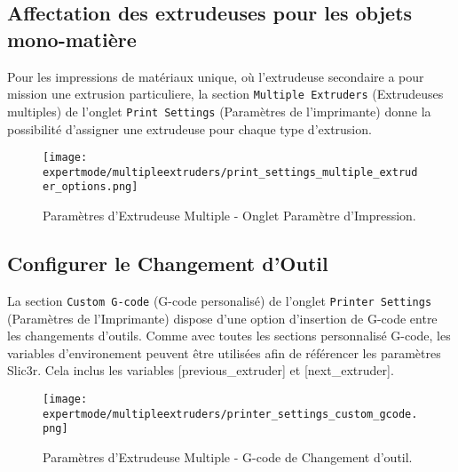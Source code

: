
\subsection{Affectation des extrudeuses pour les objets mono-mati\`ere} %
\label{sub:assigning_extruders}

Pour les impressions de mat\'eriaux unique, o\`u l'extrudeuse secondaire a pour mission une extrusion particuliere, la section \texttt{Multiple Extruders} (Extrudeuses multiples) de l'onglet \texttt{Print Settings} (Param\`etres de l'imprimante) donne la possibilit\'e d'assigner une extrudeuse pour chaque type d'extrusion.

\begin{figure}[H]
\centering
\texttt{[image: expertmode/multipleextruders/print\_settings\_multiple\_extruder\_options.png]}
\caption{Param\`etres d'Extrudeuse Multiple - Onglet Param\`etre d'Impression.}
\label{fig:advanced_multiple_extruder_options}
\end{figure}


\subsection{Configurer le Changement d'Outil} %
\label{sub:configuring_tool_changes}


La section \texttt{Custom G-code} (G-code personalis\'e) de l'onglet \texttt{Printer Settings} (Param\`etres de l'Imprimante) dispose d'une option d'insertion de G-code entre les changements d'outils. Comme avec toutes les sections personnalis\'e G-code, les variables d'environement peuvent \^etre utilis\'ees afin de r\'ef\'erencer les param\`etres Slic3r.  Cela inclus les variables [previous\_extruder] et [next\_extruder].

\begin{figure}[H]
\centering
\texttt{[image: expertmode/multipleextruders/printer\_settings\_custom\_gcode.png]}
\caption{Param\`etres d'Extrudeuse Multiple - G-code de Changement d'outil.}
\label{fig:printer_settings_custom_gcode}
\end{figure}

